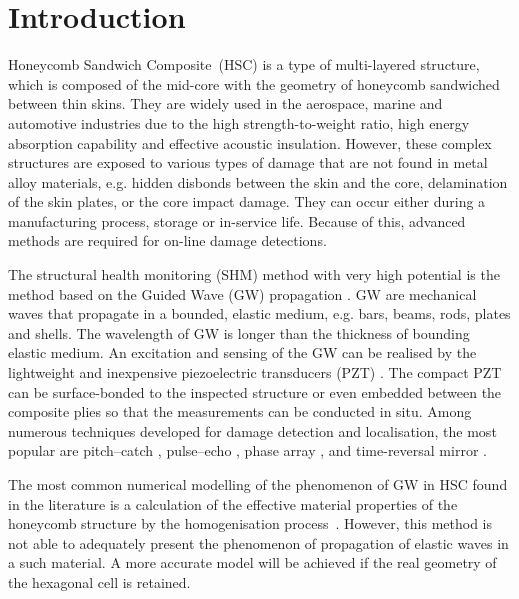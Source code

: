 \documentclass[materials,article,submit,moreauthors,pdftex]{Definitions/mdpi}
\begin{document}
\section{Introduction}
\label{sec:intro}
Honeycomb Sandwich Composite~(HSC) is a type of multi-layered structure, which is composed of the mid-core with the geometry of honeycomb sandwiched between thin skins.
They are widely used in the aerospace, marine and automotive industries due to the high strength-to-weight ratio, high energy absorption capability and effective acoustic insulation.
However, these complex structures are exposed to various types of damage that are not found in metal alloy materials, e.g. hidden disbonds between the skin and the core, delamination of the skin plates, or the core impact damage.
They can occur either during a manufacturing process, storage or in-service life.
Because of this, advanced methods are required for on-line damage detections.

The structural health monitoring (SHM) method with very high potential is the method based on the Guided Wave (GW) propagation \cite{mustapha2011assessment, sikdar2016guided, sikdar2016ultrasonic,radzienski2016assessment, yu2019core}.
GW are mechanical waves that propagate in a bounded, elastic medium, e.g. bars, beams, rods, plates and shells.
The wavelength of GW is longer than the thickness of bounding elastic medium.
An excitation and sensing of the GW can be realised by the lightweight and inexpensive piezoelectric transducers (PZT) \cite{giurgiutiumicromechatronics}.
The compact PZT can be surface-bonded to the inspected structure or even embedded between the composite plies so that the measurements can be conducted in situ.
Among numerous techniques developed for damage detection and localisation, the most popular are pitch--catch \cite{ihn2008pitch, sikdar2017structural}, pulse--echo \cite{guo1993interaction, kudela2008damage}, phase array \cite{lu2006crack, ostachowicz2008elastic}, and time-reversal mirror \cite{fink1992time, eremin2016analytically}.
	
The most common numerical modelling of the phenomenon of GW in HSC found in the literature is a calculation of the effective material properties of the honeycomb structure by the homogenisation process~\cite{shi1995derivation, qi2008ultrasonic, mustapha2014leaky, baid2015dispersion, sikdar2016guided}.
However, this method is not able to adequately present the phenomenon of propagation of elastic waves in a such material.
A more accurate model will be achieved if the real geometry of the hexagonal cell is retained.
	
\end{document}
